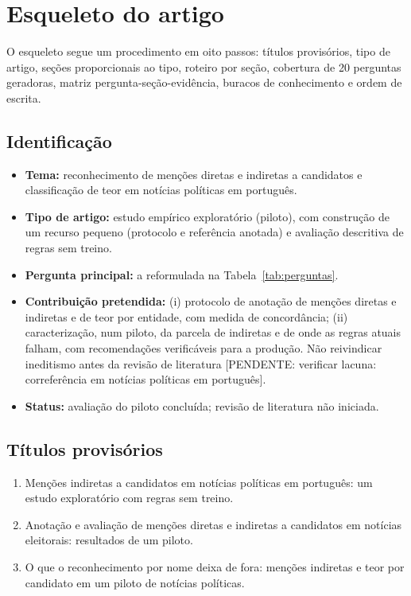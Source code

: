 \documentclass[11pt,a4paper]{article}
\newcommand{\pend}[1]{\textcolor{red!60!black}{[PENDENTE: #1]}}
\begin{document}
\section{Esqueleto do artigo}\label{sec:esqueleto}

O esqueleto segue um procedimento em oito passos: títulos provisórios, tipo de artigo, seções proporcionais ao tipo, roteiro por seção, cobertura de 20 perguntas geradoras, matriz pergunta-seção-evidência, buracos de conhecimento e ordem de escrita.

\subsection{Identificação}

\begin{itemize}
\item \textbf{Tema:} reconhecimento de menções diretas e indiretas a candidatos e classificação de teor em notícias políticas em português.
\item \textbf{Tipo de artigo:} estudo empírico exploratório (piloto), com construção de um recurso pequeno (protocolo e referência anotada) e avaliação descritiva de regras sem treino.
\item \textbf{Pergunta principal:} a reformulada na Tabela~\ref{tab:perguntas}.
\item \textbf{Contribuição pretendida:} (i) protocolo de anotação de menções diretas e indiretas e de teor por entidade, com medida de concordância; (ii) caracterização, num piloto, da parcela de indiretas e de onde as regras atuais falham, com recomendações verificáveis para a produção. Não reivindicar ineditismo antes da revisão de literatura \pend{verificar lacuna: correferência em notícias políticas em português}.
\item \textbf{Status:} avaliação do piloto concluída; revisão de literatura não iniciada.
\end{itemize}

\subsection{Títulos provisórios}

\begin{enumerate}
\item Menções indiretas a candidatos em notícias políticas em português: um estudo exploratório com regras sem treino.
\item Anotação e avaliação de menções diretas e indiretas a candidatos em notícias eleitorais: resultados de um piloto.
\item O que o reconhecimento por nome deixa de fora: menções indiretas e teor por candidato em um piloto de notícias políticas.
\end{enumerate}
\end{document}
